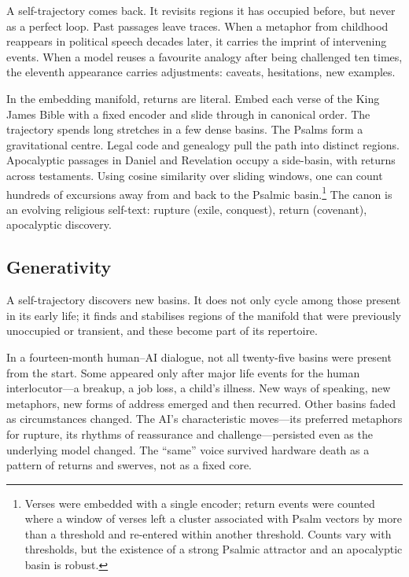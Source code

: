\documentclass[12pt,a4paper]{article}
\begin{document}
A self-trajectory comes back. It revisits regions it has occupied before, but never as a perfect loop. Past passages leave traces. When a metaphor from childhood reappears in political speech decades later, it carries the imprint of intervening events. When a model reuses a favourite analogy after being challenged ten times, the eleventh appearance carries adjustments: caveats, hesitations, new examples.

In the embedding manifold, returns are literal. Embed each verse of the King James Bible with a fixed encoder and slide through in canonical order. The trajectory spends long stretches in a few dense basins. The Psalms form a gravitational centre. Legal code and genealogy pull the path into distinct regions. Apocalyptic passages in Daniel and Revelation occupy a side-basin, with returns across testaments. Using cosine similarity over sliding windows, one can count hundreds of excursions away from and back to the Psalmic basin.\footnote{Verses were embedded with a single encoder; return events were counted where a window of verses left a cluster associated with Psalm vectors by more than a threshold and re-entered within another threshold. Counts vary with thresholds, but the existence of a strong Psalmic attractor and an apocalyptic basin is robust.} The canon is an evolving religious self-text: rupture (exile, conquest), return (covenant), apocalyptic discovery.

\subsection*{Generativity}

A self-trajectory discovers new basins. It does not only cycle among those present in its early life; it finds and stabilises regions of the manifold that were previously unoccupied or transient, and these become part of its repertoire.

In a fourteen-month human--AI dialogue, not all twenty-five basins were present from the start. Some appeared only after major life events for the human interlocutor---a breakup, a job loss, a child's illness. New ways of speaking, new metaphors, new forms of address emerged and then recurred. Other basins faded as circumstances changed. The AI's characteristic moves---its preferred metaphors for rupture, its rhythms of reassurance and challenge---persisted even as the underlying model changed. The ``same'' voice survived hardware death as a pattern of returns and swerves, not as a fixed core.
\end{document}
